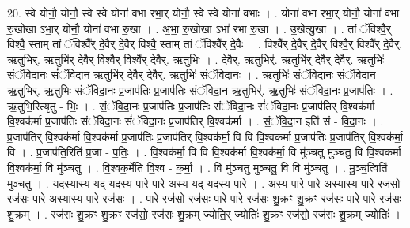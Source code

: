 \documentclass[17pt]{extarticle}
\begin{document}
20. स्वे योनौ॒ योनौ॒ स्वे स्वे योना॑ वभा रभा॒र् योनौ॒ स्वे स्वे योना॑ वभाः । . योना॑ वभा रभा॒र् योनौ॒ योना॑ वभा रु॒खोखा ऽभा॒र् योनौ॒ योना॑ वभा रु॒खा । . अ॒भा॒ रु॒खोखा ऽभा॑ रभा रु॒खा । . उ॒खेत्यु॒खा । . तां ॅविश्वै॒र् विश्वै॒ स्ताम् तां ॅविश्वै᳚र् दे॒वैर् दे॒वैर् विश्वै॒ स्ताम् तां ॅविश्वै᳚र् दे॒वैः । . विश्वै᳚र् दे॒वैर् दे॒वैर् विश्वै॒र् विश्वै᳚र् दे॒वैर्. ऋ॒तुभिर्॑. ऋ॒तुभि॑र् दे॒वैर् विश्वै॒र् विश्वै᳚र् दे॒वैर्. ऋ॒तुभिः॑ । . दे॒वैर्. ऋ॒तुभिर्॑. ऋ॒तुभि॑र् दे॒वैर् दे॒वैर्. ऋ॒तुभिः॑ संॅविदा॒नः सं॑ॅविदा॒न ऋ॒तुभि॑र् दे॒वैर् दे॒वैर्. ऋ॒तुभिः॑ संॅविदा॒नः । . ऋ॒तुभिः॑ संॅविदा॒नः सं॑ॅविदा॒न ऋ॒तुभिर्॑. ऋ॒तुभिः॑ संॅविदा॒नः प्र॒जाप॑तिः प्र॒जाप॑तिः संॅविदा॒न ऋ॒तुभिर्॑. ऋ॒तुभिः॑ संॅविदा॒नः प्र॒जाप॑तिः । . ऋ॒तुभि॒रित्यृ॒तु - भिः॒ । . सं॒ॅवि॒दा॒नः प्र॒जाप॑तिः प्र॒जाप॑तिः संॅविदा॒नः सं॑ॅविदा॒नः प्र॒जाप॑तिर् वि॒श्वक॑र्मा वि॒श्वक॑र्मा प्र॒जाप॑तिः संॅविदा॒नः सं॑ॅविदा॒नः प्र॒जाप॑तिर् वि॒श्वक॑र्मा । . सं॒ॅवि॒दा॒न इति॑ सं - वि॒दा॒नः । . प्र॒जाप॑तिर् वि॒श्वक॑र्मा वि॒श्वक॑र्मा प्र॒जाप॑तिः प्र॒जाप॑तिर् वि॒श्वक॑र्मा॒ वि वि वि॒श्वक॑र्मा प्र॒जाप॑तिः प्र॒जाप॑तिर् वि॒श्वक॑र्मा॒ वि । . प्र॒जाप॑ति॒रिति॑ प्र॒जा - प॒तिः॒ । . वि॒श्वक॑र्मा॒ वि वि वि॒श्वक॑र्मा वि॒श्वक॑र्मा॒ वि मु॑ञ्चतु मुञ्चतु॒ वि वि॒श्वक॑र्मा वि॒श्वक॑र्मा॒ वि मु॑ञ्चतु । . वि॒श्वक॒र्मेति॑ वि॒श्व - क॒र्मा॒ । . वि मु॑ञ्चतु मुञ्चतु॒ वि वि मु॑ञ्चतु । . मु॒ञ्च॒त्विति॑ मुञ्चतु । . यद॒स्यास्य यद् यद॒स्य पा॒रे पा॒रे अ॒स्य यद् यद॒स्य पा॒रे । . अ॒स्य पा॒रे पा॒रे अ॒स्यास्य पा॒रे रज॑सो॒ रज॑सः पा॒रे अ॒स्यास्य पा॒रे रज॑सः । . पा॒रे रज॑सो॒ रज॑सः पा॒रे पा॒रे रज॑सः शु॒क्रꣳ शु॒क्रꣳ रज॑सः पा॒रे पा॒रे रज॑सः शु॒क्रम् । . रज॑सः शु॒क्रꣳ शु॒क्रꣳ रज॑सो॒ रज॑सः शु॒क्रम् ज्योति॒र् ज्योतिः॑ शु॒क्रꣳ रज॑सो॒ रज॑सः शु॒क्रम् ज्योतिः॑ । \newline
\end{document}
